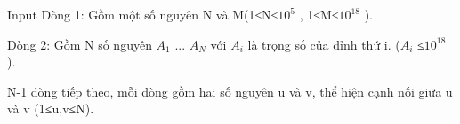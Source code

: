 Input
Dòng 1: Gồm một số nguyên N và M(1≤N≤$10^{5}$   , 1≤M≤$10^{18}$   ).  

   Dòng 2: Gồm N số nguyên $A_{1}$   ... $A_{N}$   với $A_{i}$   là trọng số của đỉnh thứ i. ($A_{i}$   ≤$10^{18}$   ).  

   N-1 dòng tiếp theo, mỗi dòng gồm hai số nguyên u và v, thể hiện cạnh nối giữa u và v (1≤u,v≤N).
